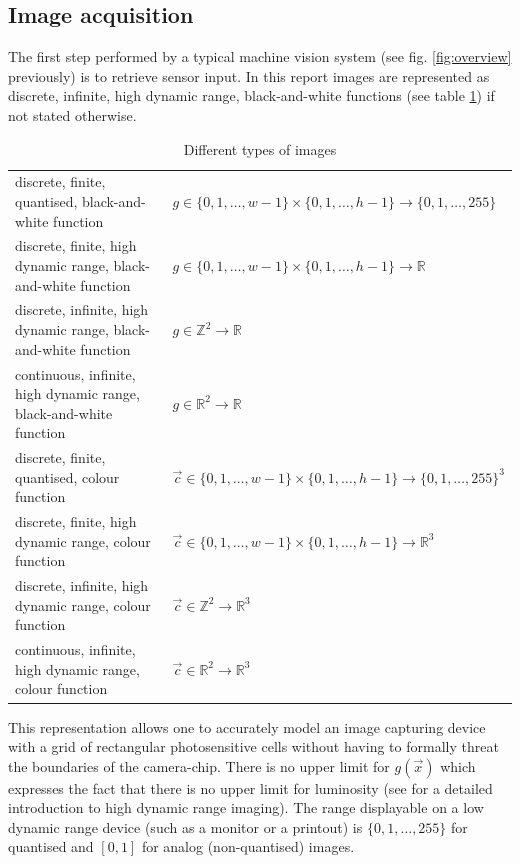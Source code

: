 \documentclass[a4paper,12pt]{book}
\begin{document}
\subsection{Image acquisition}
The first step performed by a typical machine vision system (see fig.
\ref{fig:overview} previously) is to retrieve sensor input. In this report
images are represented as discrete, infinite, high dynamic range,
black-and-white functions (see table \ref{tbl:image}) if not stated
otherwise.
\begin{table}[htbp]
  \begin{center}
    \caption{Different types of images\label{tbl:image}} %
    \begin{tabular}{ll}\toprule
      \parbox[t]{.35\textwidth}{discrete, finite, quantised, black-and-white function} &
      \parbox[t]{.55\textwidth}{$g\in\{0,1,\ldots,w-1\}\times\{0,1,\ldots,h-1\}\to\{0,1,\ldots,255\}$}\\
      \parbox[t]{.35\textwidth}{discrete, finite, high dynamic range, black-and-white function} &
      \parbox[t]{.55\textwidth}{$g\in\{0,1,\ldots,w-1\}\times\{0,1,\ldots,h-1\}\to\mathbb{R}$}\\
      \parbox[t]{.35\textwidth}{discrete, infinite, high dynamic range, black-and-white function} &
      \parbox[t]{.55\textwidth}{$g\in\mathbb{Z}^2\to\mathbb{R}$}\\
      \parbox[t]{.35\textwidth}{continuous, infinite, high dynamic range, black-and-white function} &
      \parbox[t]{.55\textwidth}{$g\in\mathbb{R}^2\to\mathbb{R}$}\\\midrule
      \parbox[t]{.35\textwidth}{discrete, finite, quantised, colour function} &
      \parbox[t]{.55\textwidth}{$\vec{c}\in\{0,1,\ldots,w-1\}\times\{0,1,\ldots,h-1\}\to\{0,1,\ldots,255\}^3$}\\
      \parbox[t]{.35\textwidth}{discrete, finite, high dynamic range, colour function} &
      \parbox[t]{.55\textwidth}{$\vec{c}\in\{0,1,\ldots,w-1\}\times\{0,1,\ldots,h-1\}\to\mathbb{R}^3$}\\
      \parbox[t]{.35\textwidth}{discrete, infinite, high dynamic range, colour function} &
      \parbox[t]{.55\textwidth}{$\vec{c}\in\mathbb{Z}^2\to\mathbb{R}^3$}\\
      \parbox[t]{.35\textwidth}{continuous, infinite, high dynamic range, colour function} &
      \parbox[t]{.55\textwidth}{$\vec{c}\in\mathbb{R}^2\to\mathbb{R}^3$}\\\bottomrule
    \end{tabular}
  \end{center}
\end{table}
This representation allows one to accurately model an image capturing device
with a grid of rectangular photosensitive cells without having to formally
threat the boundaries of the camera-chip. %
There is no upper limit for
$g(\vec{x})$ which expresses the fact that there is no upper limit for
luminosity (see \cite{RefWorks:422} for a detailed introduction to high
dynamic range imaging). The range displayable on a low dynamic range device
(such as a monitor or a printout) is $\{0,1,\ldots,255\}$ for quantised
and $[0,1]$ for analog (non-quantised) images.
\end{document}
